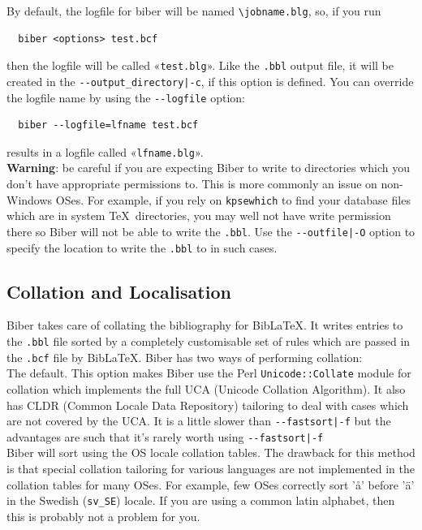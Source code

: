\documentclass{ltxdockit}
\def\biberex#1{\hbox{\hspace{-4em}\texttt{\small \detokenize{#1}}}}
\begin{document}
By default, the logfile for biber will be named \verb+\jobname.blg+,
so, if you run

\begin{verbatim}
  biber <options> test.bcf
\end{verbatim}

\noindent then the logfile will be called «\verb+test.blg+». Like the
\verb+.bbl+ output file, it will be created in the
\verb+--output_directory|-c+, if this option is defined. You can
override the logfile name by using the \verb+--logfile+ option:

\begin{verbatim}
  biber --logfile=lfname test.bcf
\end{verbatim}

\noindent results in a logfile called «\verb+lfname.blg+».\\

\noindent \textbf{Warning}: be careful if you are expecting Biber to
write to directories which you don't have appropriate permissions to. This
is more commonly an issue on non-Windows OSes. For example, if you rely on
\verb+kpsewhich+ to find your database files which are in system \TeX\
directories, you may well not have write permission there so Biber
will not be able to write the \verb+.bbl+. Use the \verb+--outfile|-O+
option to specify the location to write the \verb+.bbl+ to in such cases.

\subsection{Collation and Localisation}\label{coll}

Biber takes care of collating the bibliography for
Bib\LaTeX. It writes entries to the \verb+.bbl+ file sorted by a
completely customisable set of rules which are passed in the
\verb+.bcf+ file by Bib\LaTeX. Biber has two ways of performing
collation:\\[2ex]

\biberex{--collate|-C}
  \noindent The default. This option makes Biber use the Perl
  \verb+Unicode::Collate+ module for collation which implements the full UCA (Unicode
  Collation Algorithm). It also has CLDR (Common Locale Data
  Repository) tailoring to deal with cases which are not covered by the
  UCA. It is a little slower than \verb+--fastsort|-f+ but the
  advantages are such that it's rarely worth using \verb+--fastsort|-f+\\[1ex]

\biberex{--fastsort|-f}
  \noindent Biber will sort using
  the OS locale collation tables. The drawback for this method is that special
  collation tailoring for various languages are not implemented in the
  collation tables for many OSes. For example, few OSes correctly sort 'å'
  before 'ä' in the Swedish (\verb+sv_SE+) locale. If you are using a
  common latin alphabet, then this is probably not a problem for you.\\[2ex]
\end{document}
